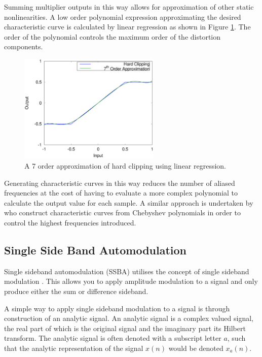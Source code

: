 			Summing multiplier outputs in this way allows for approximation of other static
			nonlinearities. A low order polynomial expression approximating the desired characteristic curve
			is calculated by linear regression as shown in Figure \ref{fig:ClippingApproximation}. The
			order of the polynomial controls the maximum order of the distortion components.

			\begin{figure}[h!]
				\centering
				\includegraphics[width=0.6\textwidth]{chapter3/Images/ClippingApproximation.eps}
				\caption{A 7 order approximation of hard clipping using linear regression.}
				\label{fig:ClippingApproximation}
			\end{figure}

			Generating characteristic curves in this way reduces the number of aliased frequencies at the cost
			of having to evaluate a more complex polynomial to calculate the output value for each sample. A
			similar approach is undertaken by \cite{fernandez-cid2001distortion} who construct characteristic
			curves from Chebyshev polynomials in order to control the highest frequencies introduced.


	\subsection{Single Side Band Automodulation}
	\label{sec:Excitation-SSBA}
		Single sideband automodulation (SSBA) utilises the concept of single sideband modulation
		\citep{corinthios2009signals}. This allows you to apply amplitude modulation to a signal and only produce
		either the sum or difference sideband.

		A simple way to apply single sideband modulation to a signal is through construction of an analytic signal.
		An analytic signal is a complex valued signal, the real part of which is the original signal and the
		imaginary part its Hilbert transform. The analytic signal is often denoted with a subscript letter
		$a$, such that the analytic representation of the signal $x(n)$ would be denoted $x_{a}(n)$.

